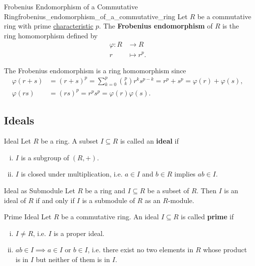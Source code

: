 \begin{definition}{Frobenius Endomorphism of a Commutative Ring}{frobenius_endomorphism_of_a_commutative_ring}
    Let $R$ be a commutative ring with prime \hyperref[th:characteristic_of_a_ring]{characteristic} $p$. The \textbf{Frobenius endomorphism} of $R$ is the ring homomorphism defined by
    \begin{align*}
        \varphi: R & \longrightarrow  R \\
        r & \longmapsto  r^p.
    \end{align*}
\end{definition}
\begin{remark}
    The Frobenius endomorphism is a ring homomorphism since
    \begin{align*}
        \varphi(r+s)&=(r+s)^p=\sum_{k=0}^p\binom{p}{k}r^ks^{p-k}=r^p+s^p=\varphi(r)+\varphi(s),\\
        \varphi(rs)&=(rs)^p=r^ps^p=\varphi(r)\varphi(s).
    \end{align*}
\end{remark}

\subsection{Ideals}
\begin{definition}{Ideal}{}
    Let $R$ be a ring. A subset $I\subseteq R$ is called an \textbf{ideal} if
    \begin{enumerate}[(i)]
        \item $I$ is a subgroup of $(R,+)$.
        \item $I$ is closed under multiplication, i.e. $a\in I$ and $b\in R$ implies $ab\in I$.
    \end{enumerate}
\end{definition}


\begin{proposition}{Ideal as Submodule}{}
    Let $R$ be a ring and $I\subseteq R$ be a subset of $R$. Then $I$ is an ideal of $R$ if and only if $I$ is a submodule of $R$ as an $R$-module.
\end{proposition}


\begin{definition}{Prime Ideal}{}
    Let $R$ be a commutative ring. An ideal $I\subseteq R$ is called \textbf{prime} if 
    \begin{enumerate}[(i)]
        \item $I\neq R$, i.e. $I$ is a proper ideal.
        \item $ab\in I\implies a\in I\text{ or }b\in I$, i.e. there exist no two elements in $R$ whose product is in $I$ but neither of them is in $I$.
    \end{enumerate}    
\end{definition}

